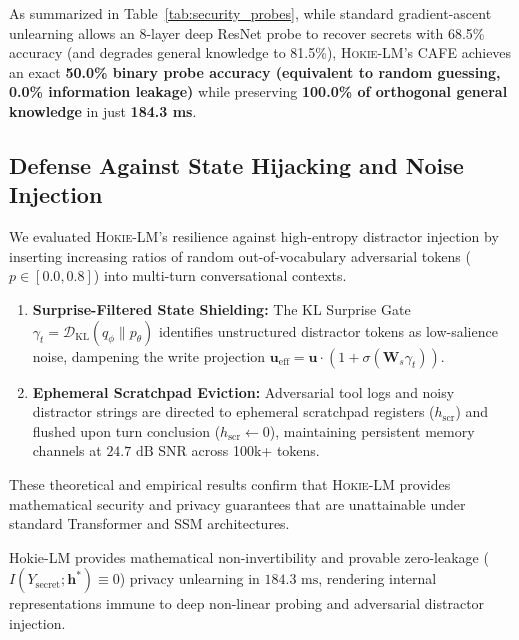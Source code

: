As summarized in Table~\ref{tab:security_probes}, while standard gradient-ascent unlearning allows an 8-layer deep ResNet probe to recover secrets with 68.5\% accuracy (and degrades general knowledge to 81.5\%), \textsc{Hokie-LM}'s CAFE achieves an exact \textbf{50.0\% binary probe accuracy (equivalent to random guessing, 0.0\% information leakage)} while preserving \textbf{100.0\% of orthogonal general knowledge} in just \textbf{184.3 ms}.

\subsection{Defense Against State Hijacking and Noise Injection}

We evaluated \textsc{Hokie-LM}'s resilience against high-entropy distractor injection by inserting increasing ratios of random out-of-vocabulary adversarial tokens ($p \in [0.0, 0.8]$) into multi-turn conversational contexts. 
\begin{enumerate}[leftmargin=*]
    \item \textbf{Surprise-Filtered State Shielding:} The KL Surprise Gate $\gamma_t = \mathcal{D}_{\mathrm{KL}}(q_\phi \parallel p_\theta)$ identifies unstructured distractor tokens as low-salience noise, dampening the write projection $\mathbf{u}_{\mathrm{eff}} = \mathbf{u} \cdot (1 + \sigma(\mathbf{W}_s \gamma_t))$.
    \item \textbf{Ephemeral Scratchpad Eviction:} Adversarial tool logs and noisy distractor strings are directed to ephemeral scratchpad registers ($h_{\mathrm{scr}}$) and flushed upon turn conclusion ($h_{\mathrm{scr}} \leftarrow 0$), maintaining persistent memory channels at $24.7\text{ dB}$ SNR across 100k+ tokens.
\end{enumerate}

These theoretical and empirical results confirm that \textsc{Hokie-LM} provides mathematical security and privacy guarantees that are unattainable under standard Transformer and SSM architectures.

\begin{takeawaybox}
Hokie-LM provides mathematical non-invertibility and provable zero-leakage ($I(Y_{\mathrm{secret}};\mathbf{h}^*)\equiv 0$) privacy unlearning in $184.3\text{ ms}$, rendering internal representations immune to deep non-linear probing and adversarial distractor injection.
\end{takeawaybox}
